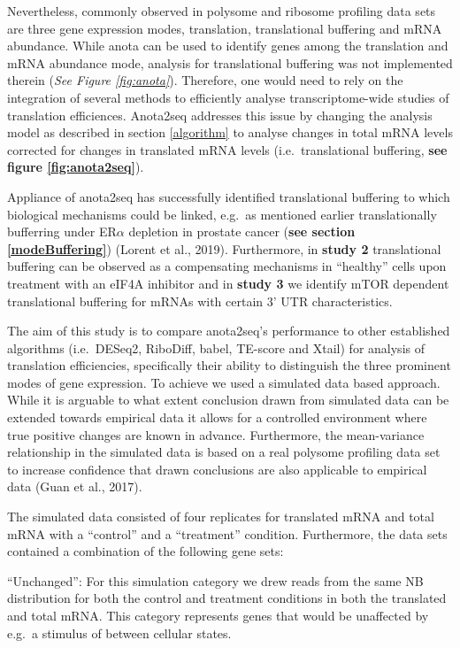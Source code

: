 \documentclass[12pt,openany]{book}
\begin{document}
Nevertheless, commonly observed in polysome and ribosome profiling data
sets are three gene expression modes, translation, translational
buffering and mRNA abundance. While anota can be used to identify genes
among the translation and mRNA abundance mode, analysis for
translational buffering was not implemented therein (\emph{See Figure
\ref{fig:anota}}). Therefore, one would need to rely on the integration
of several methods to efficiently analyse transcriptome-wide studies of
translation efficiences. Anota2seq addresses this issue by changing the
analysis model as described in section \ref{algorithm} to analyse
changes in total mRNA levels corrected for changes in translated mRNA
levels (i.e.~translational buffering, \textbf{see figure
\ref{fig:anota2seq}}).

Appliance of anota2seq has successfully identified translational
buffering to which biological mechanisms could be linked, e.g.~as
mentioned earlier translationally bufferring under ER\(\alpha\)
depletion in prostate cancer (\textbf{see section \ref{modeBuffering}})
(Lorent et al., 2019). Furthermore, in \textbf{study 2} translational
buffering can be observed as a compensating mechanisms in ``healthy''
cells upon treatment with an eIF4A inhibitor and in \textbf{study 3} we
identify mTOR dependent translational buffering for mRNAs with certain
3' UTR characteristics.

The aim of this study is to compare anota2seq's performance to other
established algorithms (i.e.~DESeq2, RiboDiff, babel, TE-score and
Xtail) for analysis of translation efficiencies, specifically their
ability to distinguish the three prominent modes of gene expression. To
achieve we used a simulated data based approach. While it is arguable to
what extent conclusion drawn from simulated data can be extended towards
empirical data it allows for a controlled environment where true
positive changes are known in advance. Furthermore, the mean-variance
relationship in the simulated data is based on a real polysome profiling
data set to increase confidence that drawn conclusions are also
applicable to empirical data (Guan et al., 2017).

The simulated data consisted of four replicates for translated mRNA and
total mRNA with a ``control'' and a ``treatment'' condition.
Furthermore, the data sets contained a combination of the following gene
sets:

``Unchanged'': For this simulation category we drew reads from the same
NB distribution for both the control and treatment conditions in both
the translated and total mRNA. This category represents genes that would
be unaffected by e.g.~a stimulus of between cellular states.
\end{document}
